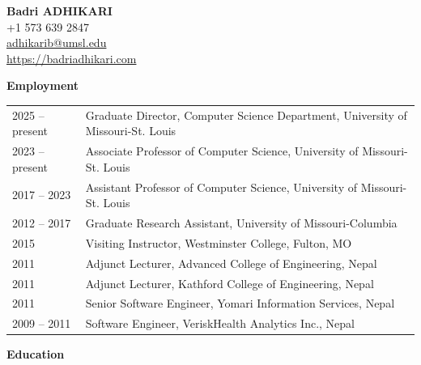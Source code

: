 \documentclass[11pt]{article}
\begin{document}
\selectfont

\begin{center}
{\large{\textbf{Badri ADHIKARI}}} \\
\vspace{0.2cm}
\phone \space +1 573 639 2847 \\

\Letter \space \textcolor{blue}{\href{mailto:adhikarib@umsl.edu}{adhikarib@umsl.edu}} \\
\Mundus \space \textcolor{blue}{\href{https://badriadhikari.com}{https://badriadhikari.com}} \\
\end{center}


\flushleft

\textbf{Employment}

\vspace{0.5cm}

\begin{tabular}{ l l }
2025 – present & Graduate Director, Computer Science Department, University of Missouri-St. Louis \\
2023 – present & Associate Professor of Computer Science, University of Missouri-St. Louis \\
2017 – 2023 & Assistant Professor of Computer Science, University of Missouri-St. Louis \\
2012 – 2017	   & Graduate Research Assistant, University of Missouri-Columbia \\
2015 & Visiting Instructor, Westminster College, Fulton, MO \\
2011 & Adjunct Lecturer, Advanced College of Engineering, Nepal \\
2011 & Adjunct Lecturer, Kathford College of Engineering, Nepal \\
2011 & Senior Software Engineer, Yomari Information Services, Nepal \\
2009 – 2011 & Software Engineer, VeriskHealth Analytics Inc., Nepal
\end{tabular}

\vspace{0.5cm}

\textbf{Education}

\vspace{0.5cm}
\end{document}

